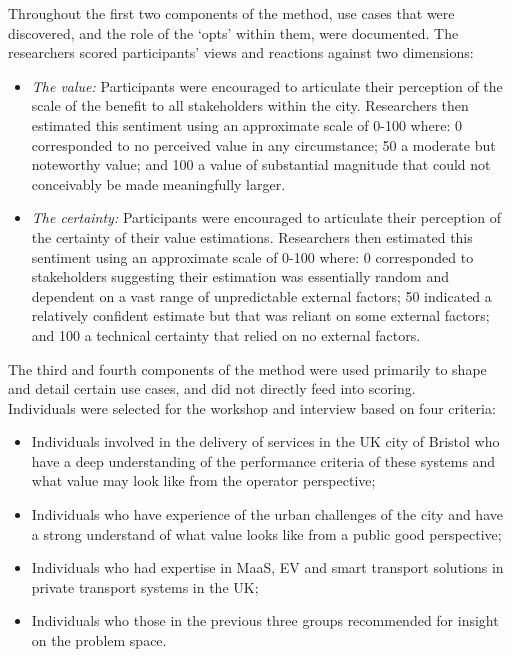 \documentclass[b5paper,10pt]{article}
\begin{document}
Throughout the first two components of the method, use cases that were
discovered, and the role of the `opts' within them, were
documented. The researchers scored participants' views and reactions
against two dimensions:

\begin{itemize}
\item {\emph{The value:}} Participants were encouraged to articulate their
perception of the scale of the benefit to all stakeholders within the
city. Researchers then estimated this sentiment using an approximate
scale of 0-100 where: 0 corresponded to no perceived value in any
circumstance; 50 a moderate but noteworthy value; and 100 a value of
substantial magnitude that could not conceivably be made meaningfully larger.
\item {\emph{The certainty:}} Participants were encouraged to articulate
their perception of the certainty of their value estimations. Researchers then
estimated this sentiment using an approximate scale of 0-100 where: 0
corresponded to stakeholders suggesting their estimation was
essentially random and dependent on a vast range of unpredictable
external factors; 50 indicated a relatively confident estimate but that was
reliant on some external factors; and 100 a technical certainty that
relied on no external factors.
\end{itemize}

The third and fourth components of the method were used primarily to
shape and detail certain use cases, and did not directly feed into
scoring.\\

Individuals were selected for the workshop and interview based on four
criteria: 

\begin{itemize}
\item Individuals involved in the delivery of services in
the UK city of Bristol who have a deep understanding of
the performance criteria of these systems and what value may look like
from the operator perspective;
\item Individuals who have experience of the urban challenges of the
city and have a strong understand of what value looks like from a
public good perspective;
\item Individuals who had expertise in MaaS, EV and smart
transport solutions in private transport systems in the UK;
\item Individuals who those in the previous three groups recommended for
insight on the problem space.
\end{itemize}
\end{document}

